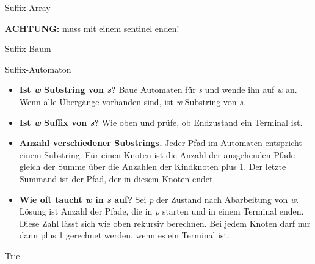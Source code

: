 \begin{algorithm}{Suffix-Array}
\begin{methods}
\end{methods}
\textbf{ACHTUNG:}  muss mit einem sentinel enden! 
\end{algorithm}

\begin{algorithm}{Suffix-Baum}
	\begin{methods}
	\end{methods}
\end{algorithm}

\begin{algorithm}{Suffix-Automaton}
	\begin{itemize}
		\item \textbf{Ist \textit{w} Substring von \textit{s}?}
		Baue Automaten für \textit{s} und wende ihn auf \textit{w} an.
		Wenn alle Übergänge vorhanden sind, ist \textit{w} Substring von \textit{s}.
	
		\item \textbf{Ist \textit{w} Suffix von \textit{s}?}
		Wie oben und prüfe, ob Endzustand ein Terminal ist.
	
		\item \textbf{Anzahl verschiedener Substrings.}
		Jeder Pfad im Automaten entspricht einem Substring.
		Für einen Knoten ist die Anzahl der ausgehenden Pfade gleich der Summe über die Anzahlen der Kindknoten plus 1.
		Der letzte Summand ist der Pfad, der in diesem Knoten endet.
	
		\item \textbf{Wie oft taucht \textit{w} in \textit{s} auf?}
		Sei \textit{p} der Zustand nach Abarbeitung von \textit{w}.
		Lösung ist Anzahl der Pfade, die in \textit{p} starten und in einem Terminal enden.
		Diese Zahl lässt sich wie oben rekursiv berechnen.
		Bei jedem Knoten darf nur dann plus 1 gerechnet werden, wenn es ein Terminal ist.
	\end{itemize}
\end{algorithm}

\begin{algorithm}{Trie}
\end{algorithm}
